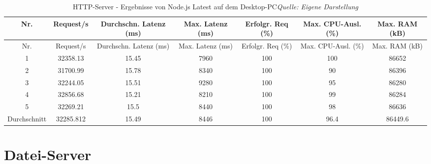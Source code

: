 	\begin{longtable}{
			c
			S[table-format=6.2]
			S[table-format=2.2]
			S[table-format=3.0]
			S[table-format=3]
			S[table-format=2.0]
			S[table-format=5.1]
		}
		\caption[HTTP-Server - Ergebnisse von Node.js Latest auf dem Desktop-PC]{HTTP-Server - Ergebnisse von Node.js Latest auf dem Desktop-PC\protect\linebreak\textit{Quelle: Eigene Darstellung}}
		\label{tab:http-ubuntu-nodejs-current}
		\\
		\toprule
		Nr. & {Request/s} & {Durchschn. Latenz (ms)} & {Max. Latenz (ms)} & {Erfolgr. Req (\%)} & {Max. CPU-Ausl. (\%)} & {Max. RAM (kB)} \\
		\midrule
		\endfirsthead
		\toprule
		Nr. & {Request/s} & {Durchschn. Latenz (ms)} & {Max. Latenz (ms)} & {Erfolgr. Req (\%)} & {Max. CPU-Ausl. (\%)} & {Max. RAM (kB)} \\
		\midrule
		 & 32358.13 & 15.45 & 7960 & 100 & 100 & 86652 \\
		2 & 31700.99 & 15.78 & 8340 & 100 & 90 & 86396 \\
		3 & 32244.05 & 15.51 & 9280 & 100 & 95 & 86280 \\
		4 & 32856.68 & 15.21 & 8210 & 100 & 99 & 86284 \\
		5 & 32269.21 & 15.5 & 8440 & 100 & 98 & 86636 \\
		Durchschnitt & 32285.812 & 15.49 & 8446 & 100 & 96.4 & 86449.6 \\
		\bottomrule
	\end{longtable}
	\newpage
	
	\section{Datei-Server} \label{sec:benchmark-results-file-server}
	
